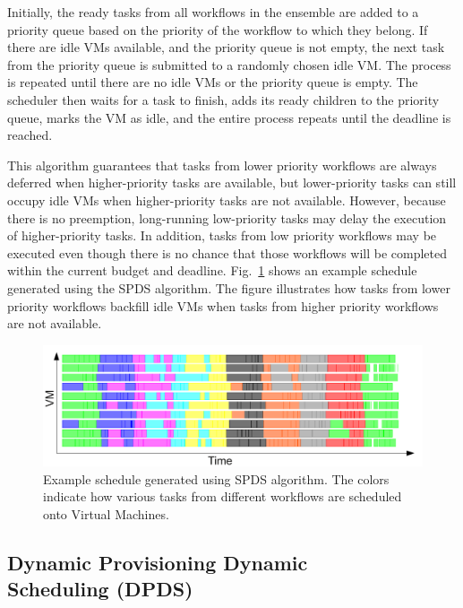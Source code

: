 \documentclass{sig-alternate}
\begin{document}
Initially, the ready tasks from all workflows in the ensemble are added to a 
priority queue based on the priority of the workflow to which they belong. If
there are idle VMs available, and the priority queue is not empty, the next task
from the priority queue is submitted to a randomly chosen idle VM. The process is 
repeated until there are no idle VMs or the priority queue is empty. The scheduler
then waits for a task to finish, adds its ready children to the priority queue,
marks the VM as idle, and the entire process repeats until the deadline is reached.

This algorithm guarantees that tasks from lower priority workflows are
always deferred when higher-priority tasks are available, but lower-priority
tasks can still occupy idle VMs when higher-priority tasks are not available. 
However, because there is no preemption, long-running low-priority tasks may delay 
the execution of higher-priority tasks. In addition, tasks from low priority 
workflows may be executed even though there is no chance that those workflows 
will be completed within the current budget and deadline. Fig.~\ref{fig:spds-example} 
shows an example schedule generated using the SPDS algorithm. The figure illustrates 
how tasks from lower priority workflows backfill idle VMs when tasks from higher 
priority workflows are not available.

\begin{figure}[htb] 
\centering
\includegraphics[width=1.0\columnwidth]{figures/spds-gantt}
 \caption{Example schedule generated using SPDS algorithm. The colors indicate how various tasks from different workflows are scheduled onto Virtual Machines. }
\label{fig:spds-example}
\end{figure}

\subsection{Dynamic Provisioning Dynamic \\Scheduling (DPDS)}
 
\end{document}
